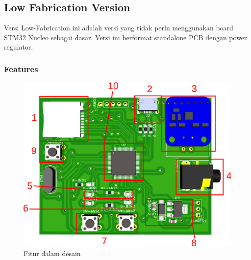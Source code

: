 \documentclass[12pt,]{article}
\begin{document}
	\newpage
	\subsection{Low Fabrication Version}
	
	Versi Low-Fabrication ini adalah versi yang tidak perlu menggunakan board STM32 Nucleo sebagai dasar.
	Versi ini berformat standalone PCB dengan power regulator.
	
	\subsubsection{Features}
	\begin{figure}[!ht]
		\centering
		\includegraphics[width=500pt]{images/vlofab.png}
		\caption{Fitur dalam desain}
	\end{figure}
\end{document}

